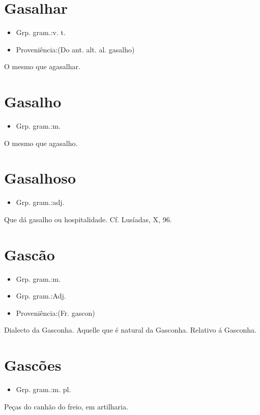 \section{Gasalhar}
\begin{itemize}
\item {Grp. gram.:v. t.}
\end{itemize}
\begin{itemize}
\item {Proveniência:(Do ant. alt. al. \textunderscore gasalho\textunderscore )}
\end{itemize}
O mesmo que \textunderscore agasalhar\textunderscore .
\section{Gasalho}
\begin{itemize}
\item {Grp. gram.:m.}
\end{itemize}
O mesmo que \textunderscore agasalho\textunderscore .
\section{Gasalhoso}
\begin{itemize}
\item {Grp. gram.:adj.}
\end{itemize}
Que dá gasalho ou hospitalidade. Cf. \textunderscore Lusíadas\textunderscore , X, 96.
\section{Gascão}
\begin{itemize}
\item {Grp. gram.:m.}
\end{itemize}
\begin{itemize}
\item {Grp. gram.:Adj.}
\end{itemize}
\begin{itemize}
\item {Proveniência:(Fr. \textunderscore gascon\textunderscore )}
\end{itemize}
Dialecto da Gasconha.
Aquelle que é natural da Gasconha.
Relativo á Gasconha.
\section{Gascões}
\begin{itemize}
\item {Grp. gram.:m. pl.}
\end{itemize}
Peças do canhão do freio, em artilharia.
